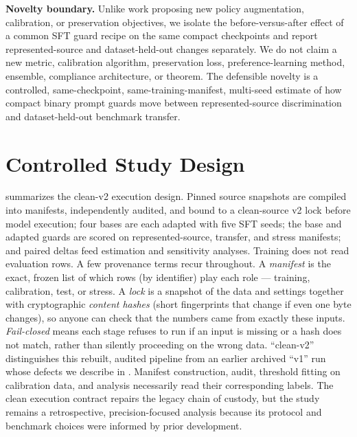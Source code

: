\documentclass[11pt]{article}
\begin{document}
\textbf{Novelty boundary.} Unlike work proposing new policy augmentation, calibration, or preservation objectives, we isolate the before-versus-after effect of a common SFT guard recipe on the same compact checkpoints and report represented-source and dataset-held-out changes separately. We do not claim a new metric, calibration algorithm, preservation loss, preference-learning method, ensemble, compliance architecture, or theorem. The defensible novelty is a controlled, same-checkpoint, same-training-manifest, multi-seed estimate of how compact binary prompt guards move between represented-source discrimination and dataset-held-out benchmark transfer.

\section{Controlled Study Design}
\label{sec:design}

 summarizes the clean-v2 execution design. Pinned source snapshots are compiled into manifests, independently audited, and bound to a clean-source v2 lock before model execution; four bases are each adapted with five SFT seeds; the base and adapted guards are scored on represented-source, transfer, and stress manifests; and paired deltas feed estimation and sensitivity analyses. Training does not read evaluation rows. A few provenance terms recur throughout. A \emph{manifest} is the exact, frozen list of which rows (by identifier) play each role --- training, calibration, test, or stress. A \emph{lock} is a snapshot of the data and settings together with cryptographic \emph{content hashes} (short fingerprints that change if even one byte changes), so anyone can check that the numbers came from exactly these inputs. \emph{Fail-closed} means each stage refuses to run if an input is missing or a hash does not match, rather than silently proceeding on the wrong data. ``clean-v2'' distinguishes this rebuilt, audited pipeline from an earlier archived ``v1'' run whose defects we describe in . Manifest construction, audit, threshold fitting on calibration data, and analysis necessarily read their corresponding labels. The clean execution contract repairs the legacy chain of custody, but the study remains a retrospective, precision-focused analysis because its protocol and benchmark choices were informed by prior development.
\end{document}
